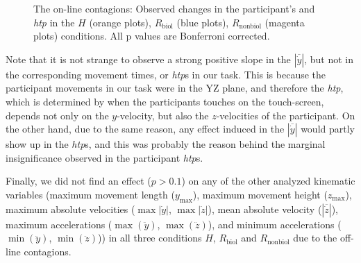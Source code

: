 \documentclass[a4paper, 12pt, oneside]{Thesis}  %
\begin{document}
\begin{figure}[t]
	\caption{The on-line contagions: Observed changes in the participant's  and \textit{htp} in the $\textit{H}$ (orange plots), $\textit{R}_{\text{biol}}$ (blue plots), $\textit{R}_{\text{nonbiol}}$ (magenta plots) conditions. All p values are Bonferroni corrected.}
	\label{fig:online}
\end{figure}

Note that it is not strange to observe a strong positive slope in the $|\overline{\dot{y}}|$, but not in the corresponding movement times, or {\it htp}s in our task. This is because the participant movements in our task were in the YZ plane, and therefore the {\it htp}, which is determined by when the participants touches on the touch-screen, depends not only on the $y$-velocity, but also the $z$-velocities of the participant. On the other hand, due to the same reason, any effect induced in the $|\overline{\dot{y}}|$ would partly show up in the {\it htp}s, and this was probably the reason behind the marginal insignificance observed in the participant {\it htp}s.

Finally, we did not find an effect ($p > 0.1$) on any of the other analyzed kinematic variables (maximum movement length ($y_{\max}$), maximum movement height ($z_{\max}$), maximum absolute velocities ($\max|\dot{y}|$, $\max|\dot{z}|$), mean absolute velocity ($|\overline{\dot{z}}|$), maximum accelerations ($\max(\ddot{y})$, $\max(\ddot{z})$), and minimum accelerations ($\min(\ddot{y})$, $\min(\ddot{z})$)) in all three conditions $H$, $R_{\text{biol}}$ and $R_{\text{nonbiol}}$ due to the off-line contagions.
\end{document}
